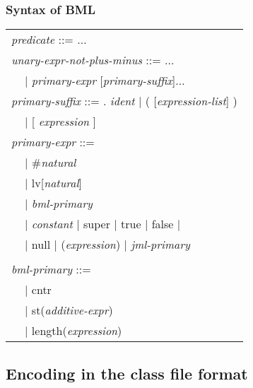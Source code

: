 \documentclass[c]{beamer}
\newcommand{\varHook}[1]{\mbox{\slshape #1}}
\newcommand{\codeHook}[1]{\mbox{\ttfamily #1}}
\begin{document}
\begin{frame} \frametitle{ Syntax of BML}
\begin{tabular}{lll}
\multicolumn{2}{l}{\varHook{predicate} ::= \(\ldots\)}\smallskip\\
\multicolumn{2}{l}{\varHook{unary-expr-not-plus-minus} ::= \(\ldots\)}\\
\hspace*{1cm} & \(\mid\) \varHook{primary-expr} [\varHook{primary-suffix}]\(\ldots\)\\ 

\multicolumn{3}{l}{\varHook{primary-suffix} ::= \codeHook{.} \varHook{ident}
\(\mid\) \codeHook{(} [\varHook{expression-list}] \codeHook{)}}\\
& \(\mid\) \codeHook{[} \varHook{expression} \codeHook{]}\\

\multicolumn{2}{l}{\varHook{primary-expr} ::= } \\
&\(\mid\) \alert{\codeHook{\#}\varHook{natural}} \\
&\(\mid\) \alert{\codeHook{lv[}\varHook{natural}\codeHook{]}} \\
&\(\mid\) \varHook{bml-primary}\\
&
\multicolumn{2}{l}{\(\mid\) \varHook{constant} \(\mid\)
\codeHook{super}
\(\mid\) \codeHook{true} \(\mid\) \codeHook{false} \(\mid\)} \\
& \(\mid\) \codeHook{null} 
\(\mid\) \codeHook{(}\varHook{expression}\codeHook{)}
\(\mid\) \varHook{jml-primary}\\
 & & \\





\multicolumn{2}{l}{\varHook{bml-primary} ::= } \\
&\(\mid\) \alert{\codeHook{cntr} } \\
&\(\mid\) \alert{\codeHook{st(}\varHook{additive-expr}\codeHook{)}} \\
&\(\mid\) \alert{\codeHook{length(}\varHook{expression}\codeHook{)}} 
\end{tabular}
\end{frame} 
  
 
\subsection{Encoding in the class file format}
\end{document}
